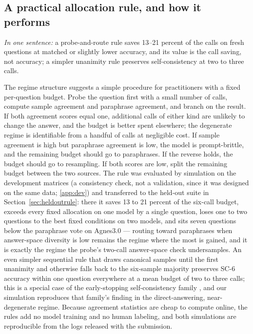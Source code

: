\subsection{A practical allocation rule, and how it performs}

\emph{In one sentence:} a probe-and-route rule saves 13--21 percent of the calls on fresh questions at matched or slightly lower accuracy, and its value is the call saving, not accuracy; a simpler unanimity rule preserves self-consistency at two to three calls.

The regime structure suggests a simple procedure for practitioners with a fixed per-question budget. Probe the question first with a small number of calls, compute sample agreement and paraphrase agreement, and branch on the result. If both agreement scores equal one, additional calls of either kind are unlikely to change the answer, and the budget is better spent elsewhere; the degenerate regime is identifiable from a handful of calls at negligible cost. If sample agreement is high but paraphrase agreement is low, the model is prompt-brittle, and the remaining budget should go to paraphrases. If the reverse holds, the budget should go to resampling. If both scores are low, split the remaining budget between the two sources. The rule was evaluated by simulation on the development matrices (a consistency check, not a validation, since it was designed on the same data; \ref{app:dev}) and transferred to the held-out suite in Section~\ref{sec:heldoutrule}: there it saves 13 to 21 percent of the six-call budget, exceeds every fixed allocation on one model by a single question, loses one to two questions to the best fixed conditions on two models, and sits seven questions below the paraphrase vote on Agnes3.0 --- routing toward paraphrases when answer-space diversity is low remains the regime where the most is gained, and it is exactly the regime the probe's two-call answer-space check undersamples. An even simpler sequential rule that draws canonical samples until the first unanimity and otherwise falls back to the six-sample majority preserves SC-6 accuracy within one question everywhere at a mean budget of two to three calls; this is a special case of the early-stopping self-consistency family \citep{aggarwal2023lets,li2024escape}, and our simulation reproduces that family's finding in the direct-answering, near-degenerate regime. Because agreement statistics are cheap to compute online, the rules add no model training and no human labeling, and both simulations are reproducible from the logs released with the submission.

